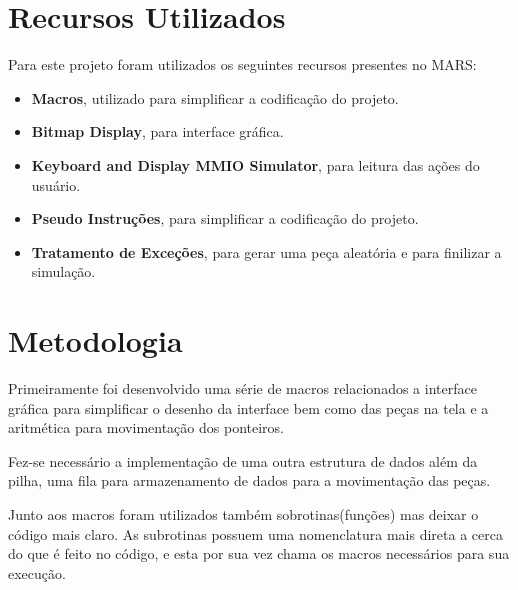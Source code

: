 \documentclass{article}
\begin{document}

\section{Recursos Utilizados}

Para este projeto foram utilizados os seguintes recursos presentes no MARS:
\begin{itemize}
  \item \textbf{Macros}, utilizado para simplificar a codificação do projeto.
  \item \textbf{Bitmap Display}, para interface gráfica.
  \item \textbf{Keyboard and Display MMIO Simulator}, para leitura das ações do usuário.
  \item \textbf{Pseudo Instruções}, para simplificar a codificação do projeto.
  \item \textbf{Tratamento de Exceções}, para gerar uma peça aleatória e para finilizar a simulação.
\end{itemize}


\section{Metodologia}

Primeiramente foi desenvolvido uma série de macros relacionados a interface gráfica para simplificar o desenho da interface bem como das peças na tela e a aritmética para movimentação dos ponteiros.

Fez-se necessário a implementação de uma outra estrutura de dados além da pilha, uma fila para armazenamento de dados para a movimentação das peças.

Junto aos macros foram utilizados também sobrotinas(funções) mas deixar o código mais claro. As subrotinas possuem uma nomenclatura mais direta a cerca do que é feito no código, e esta por sua vez chama os macros necessários para sua execução.
\end{document}
